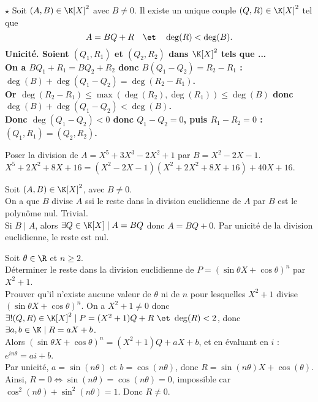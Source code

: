 \documentclass[11pt]{article}
\begin{document}
\begin{thm}{$\star$}{}
    Soit $(A,B)\in\K[X]^2$ avec $B\neq0$. Il existe un unique couple $(Q,R)\in\K[X]^2$ tel que
    \begin{equation*}
        A=BQ+R \quad\et\quad \deg(R) < \deg(B).
    \end{equation*}
    \tcblower
    \bf{Unicité.} Soient $(Q_1,R_1)$ et $(Q_2,R_2)$ dans $\K[X]^2$ tels que ...\\
    On a $BQ_1+R_1 = BQ_2+R_2$ donc $B(Q_1-Q_2)=R_2-R_1$ : $\deg(B)+\deg(Q_1-Q_2)=\deg(R_2-R_1)$.\\
    Or $\deg(R_2-R_1)\leq\max(\deg(R_2),\deg(R_1))\leq\deg(B)$ donc $\deg(B)+\deg(Q_1-Q_2)<\deg(B)$.\\
    Donc $\deg(Q_1-Q_2)<0$ donc $Q_1-Q_2=0$, puis $R_1-R_2=0$ : $(Q_1,R_1)=(Q_2,R_2)$.
\end{thm}

\begin{ex}{}{}
    Poser la division de $A=X^5+3X^3-2X^2+1$ par $B=X^2-2X-1$.
    \tcblower
    $X^5+2X^2+8X+16=(X^2-2X-1)(X^2+2X^2+8X+16) + 40X + 16$.
\end{ex}

\begin{corr}{}{}
    Soit $(A,B)\in\K[X]^2$, avec $B\neq0$.\\
    On a que $B$ divise $A$ ssi le reste dans la division euclidienne de $A$ par $B$ est le polynôme nul.
    \tcblower
    \boxed{\la} Trivial.\\
    \boxed{\ra} Si $B\mid A$, alors $\exists Q \in \K[X] \mid A = BQ$ donc $A=BQ+0$. Par unicité de la division euclidienne, le reste est nul.
\end{corr}

\begin{ex}{}{}
    Soit $\theta\in\R$ et $n\geq2$.\\
    Déterminer le reste dans la division euclidienne de $P=(\sin\theta X + \cos \theta)^n$ par $X^2+1$.\\
    Prouver qu'il n'existe aucune valeur de $\theta$ ni de $n$ pour lesquelles $X^2+1$ divise $(\sin \theta X + \cos \theta)^n$.
    \tcblower
    On a $X^2+1\neq0$ donc $\exists!(Q,R)\in\K[X]^2\mid P=(X^2+1)Q+R ~\et~ \deg(R)<2$, donc $\exists a,b\in\K\mid R=aX+b$.\\
    Alors $(\sin\theta X + \cos\theta)^n=(X^2+1)Q+aX+b$, et en évaluant en $i$ : $e^{in\theta}=ai+b$.\\
    Par unicité, $a=\sin(n\theta)$ et $b=\cos(n\theta)$, donc $R=\sin(n\theta)X+\cos(\theta)$.\\
    Ainsi, $R=0\iff \sin(n\theta)=\cos(n\theta)=0$, impossible car $\cos^2(n\theta)+\sin^2(n\theta)=1$. Donc $R\neq0$.
\end{ex}
\end{document}
